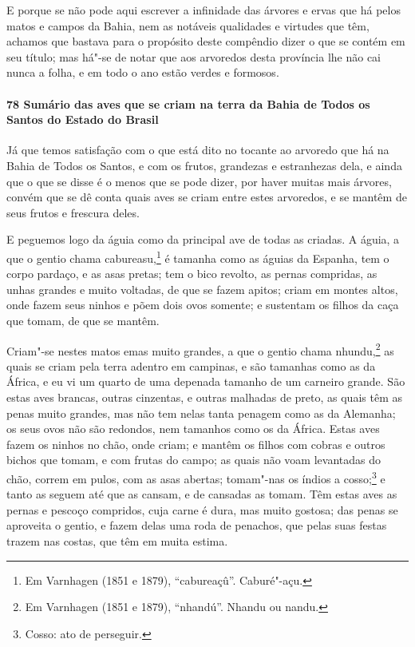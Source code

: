 E porque se não pode aqui escrever a infinidade das árvores e ervas que há pelos matos e
campos da Bahia, nem as notáveis qualidades e virtudes que têm, achamos que bastava para o
propósito deste compêndio dizer o que se contém em seu título; mas há"-se de notar que aos
arvoredos desta província lhe não cai nunca a folha, e em todo o ano estão verdes e
formosos.

\paragraph{78 Sumário das aves que se criam na terra da Bahia de Todos os Santos do Estado
do Brasil}

Já que temos satisfação com o que está dito no tocante ao arvoredo que há na Bahia de
Todos os Santos, e com os frutos, grandezas e estranhezas dela, e ainda que o que se disse
é o menos que se pode dizer, por haver muitas mais árvores, convém que se dê conta quais
aves se criam entre estes arvoredos, e se mantêm de seus frutos e frescura deles.

E peguemos logo da águia como da principal ave de todas as criadas. A águia, a que o
gentio chama cabureasu,\footnote{ Em Varnhagen (1851 e 1879), ``cabureaçû''. Caburé"-açu.}
é tamanha como as águias da Espanha, tem o corpo pardaço, e as asas pretas; tem o bico
revolto, as pernas compridas, as unhas grandes e muito voltadas, de que se fazem apitos;
criam em montes altos, onde fazem seus ninhos e põem dois ovos somente; e sustentam os
filhos da caça que tomam, de que se mantêm.

Criam"-se nestes matos emas muito grandes, a que o gentio chama nhundu,\footnote{ Em
Varnhagen (1851 e 1879), ``nhandú''. Nhandu ou nandu.} as quais se criam pela terra
adentro em campinas, e são tamanhas como as da África, e eu vi um quarto de uma depenada
tamanho de um carneiro grande. São estas aves brancas, outras cinzentas, e outras malhadas
de preto, as quais têm as penas muito grandes, mas não tem nelas tanta penagem como as da
Alemanha; os seus ovos não são redondos, nem tamanhos como os da África. Estas aves fazem
os ninhos no chão, onde criam; e mantêm os filhos com cobras e outros bichos que tomam, e
com frutas do campo; as quais não voam levantadas do chão, correm em pulos, com as asas
abertas; tomam"-nas os índios a cosso;\footnote{ Cosso: ato de perseguir.} e tanto as
seguem até que as cansam, e de cansadas as tomam. Têm estas aves as pernas e
pescoço compridos, cuja carne é dura, mas muito gostosa; das penas se aproveita o gentio,
e fazem delas uma roda de penachos, que pelas suas festas trazem nas costas, que têm em
muita estima.


